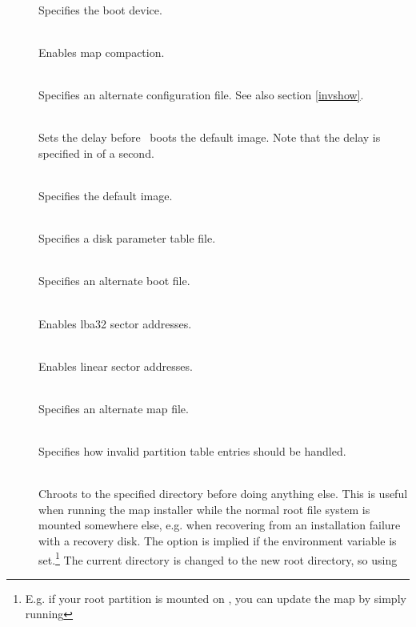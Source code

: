 \begin{description}
  \item[]~\\
    Specifies the boot device. \seealso
  \item[]~\\
    Enables map compaction. \seealso
  \item[]~\\
    Specifies an alternate configuration file. See also section \ref{invshow}.
  \item[]~\\
    Sets the delay before \LILO\ boots the default image. Note that the
    delay is specified in  of a second. \seealso
  \item[]~\\
    Specifies the default image. \seealso
  \item[]~\\
    Specifies a disk parameter table file. \seealso
  \item[]~\\
    Specifies an alternate boot file. \seealso
  \item[]~\\
    Enables lba32 sector addresses. \seealso
  \item[]~\\
    Enables linear sector addresses. \seealso
  \item[]~\\
    Specifies an alternate map file. \seealso
  \item[]~\\
    Specifies how invalid partition table entries should be handled. \seealso
  \item[]~ \\
    Chroots to the specified directory before doing anything else. This is
    useful when running the map installer while the normal root file system
    is mounted somewhere else, e.g. when recovering from an installation
    failure with a recovery disk. The  option is implied if
    the environment variable  is set.\footnote{E.g. if your root
      partition is mounted on , you can update the map by simply
      running }
    The current directory is changed to the new root directory, so using

\end{description}
